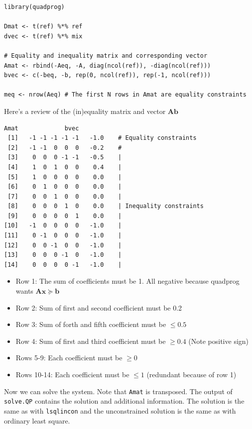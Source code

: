 \documentclass[11pt, fleqn]{article}
\begin{document}
\begin{Verbatim}[formatcom=\color{violet}, fontsize=\small]
library(quadprog)

Dmat <- t(ref) %*% ref
dvec <- t(ref) %*% mix

# Equality and inequality matrix and corresponding vector
Amat <- rbind(-Aeq, -A, diag(ncol(ref)), -diag(ncol(ref)))
bvec <- c(-beq, -b, rep(0, ncol(ref)), rep(-1, ncol(ref))) 

meq <- nrow(Aeq) # The first N rows in Amat are equality constraints
\end{Verbatim}

Here's a review of the (in)equality matrix and vector $\mathbf{A b}$

\begin{Verbatim}[formatcom=\color{violet}, fontsize=\small]
       Amat             bvec
 [1]   -1 -1 -1 -1 -1   -1.0    # Equality constraints
 [2]   -1 -1  0  0  0   -0.2    # 
 [3]    0  0  0 -1 -1   -0.5    |
 [4]    1  0  1  0  0    0.4    |
 [5]    1  0  0  0  0    0.0    |
 [6]    0  1  0  0  0    0.0    |
 [7]    0  0  1  0  0    0.0    |
 [8]    0  0  0  1  0    0.0    | Inequality constraints
 [9]    0  0  0  0  1    0.0    |
[10]   -1  0  0  0  0   -1.0    |
[11]    0 -1  0  0  0   -1.0    |
[12]    0  0 -1  0  0   -1.0    |
[13]    0  0  0 -1  0   -1.0    |
[14]    0  0  0  0 -1   -1.0    |
\end{Verbatim}

\begin{itemize}
    \item Row 1: The sum of coefficients must be 1. All negative because quadprog wants $\mathbf{Ax} \succeq \mathbf{b}$ 
    \item Row 2: Sum of first and second coefficient must be 0.2
    \item Row 3: Sum of forth and fifth coefficient must be $\leq 0.5$
    \item Row 4: Sum of first and third coefficient must be $\geq 0.4$ (Note positive sign)
    \item Rows 5-9: Each coefficient must be $\geq 0$
    \item Rows 10-14: Each coefficient must be $\leq 1$ (redundant because of row 1)
\end{itemize}

Now we can solve the system. Note that \texttt{Amat} is transposed. The output of
\texttt{solve.QP} contains the solution and additional information. The
solution is the same as with \texttt{lsqlincon} and the unconstrained solution
is the same as with ordinary least square.
\end{document}
